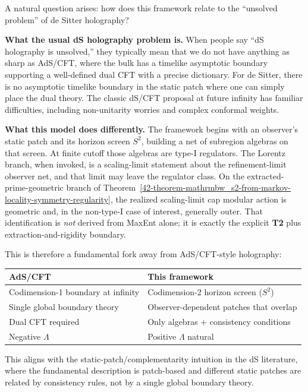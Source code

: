 A natural question arises: how does this framework relate to the ``unsolved problem'' of de Sitter holography?

\textbf{What the usual dS holography problem is.} When people say ``dS holography is unsolved,'' they typically mean that we do not have anything as sharp as AdS/CFT, where the bulk has a timelike asymptotic boundary supporting a well-defined dual CFT with a precise dictionary. For de Sitter, there is no asymptotic timelike boundary in the static patch where one can simply place the dual theory. The classic dS/CFT proposal at future infinity has familiar difficulties, including non-unitarity worries and complex conformal weights.

\textbf{What this model does differently.} The framework begins with an observer's static patch and its horizon screen \(S^2\), building a net of subregion algebras on that screen. At finite cutoff those algebras are type-I regulators. The Lorentz branch, when invoked, is a scaling-limit statement about the refinement-limit observer net, and that limit may leave the regulator class. On the extracted-prime-geometric branch of Theorem~\ref{42-theorem-mathrmbw_s2-from-markov-locality-symmetry-regularity}, the realized scaling-limit cap modular action is geometric and, in the non-type-I case of interest, generally outer. That identification is \emph{not} derived from MaxEnt alone; it is exactly the explicit \textbf{T2} plus extraction-and-rigidity boundary.

This is therefore a fundamental fork away from AdS/CFT-style holography:

{\def\LTcaptype{none}
\begin{longtable}[]{@{}>{\RaggedRight\arraybackslash}p{}>{\RaggedRight\arraybackslash}p{}@{}}
\toprule\noalign{}
AdS/CFT & This framework \\
\midrule\noalign{}
\endhead
\bottomrule\noalign{}
\endlastfoot
Codimension-1 boundary at infinity & Codimension-2 horizon screen (\(S^2\)) \\
Single global boundary theory & Observer-dependent patches that overlap \\
Dual CFT required & Only algebras + consistency conditions \\
Negative \(\Lambda\) & Positive \(\Lambda\) natural \\
\end{longtable}
}

This aligns with the static-patch/complementarity intuition in the dS literature, where the fundamental description is patch-based and different static patches are related by consistency rules, not by a single global boundary theory.

